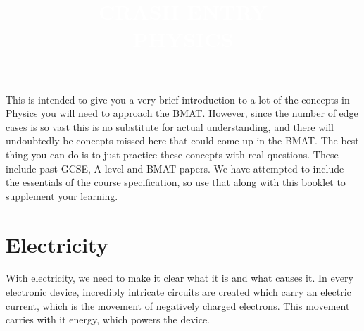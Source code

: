 \documentclass[11pt, titlepage]{article}
\title{
\HUGE\textbf{\textcolor{white}{{\addfontfeature{LetterSpace=5.0}CRASH ENTRY}}} \\
\Huge\textbf{\textcolor{white}{{\addfontfeature{LetterSpace=7.0}PHYSICS}}
}}
\author{}
\date{}
\newcommand\AtPageUpperRight[1]{\AtPageUpperLeft{%
   \makebox[\paperwidth][r]{#1}}}
\begin{document}
\afterpage{\restorepagecolor}

\maketitle




This is intended to give you a very brief introduction to a lot of the concepts in Physics you will need to approach the BMAT.  However, since the number of edge cases is so vast this is no substitute for actual understanding, and there will undoubtedly be concepts missed here that could come up in the BMAT.  The best thing you can do is to just practice these concepts with real questions.  These include past GCSE, A-level and BMAT papers.  We have attempted to include the essentials of the course specification, so use that along with this booklet to supplement your learning.

\section{Electricity}
With electricity, we need to make it clear what it is and what causes it.  In every electronic device, incredibly intricate circuits are created which carry an electric current, which is the movement of negatively charged electrons.  This movement carries with it energy, which powers the device.
\end{document}

